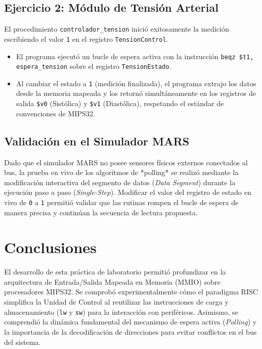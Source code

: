 \documentclass[12pt, letterpaper]{article}
\begin{document}
\subsection{Ejercicio 2: Módulo de Tensión Arterial}
El procedimiento \texttt{controlador\_tension} inició exitosamente la medición escribiendo el valor \texttt{1} en el registro \texttt{TensionControl}.
\begin{itemize}
    \item El programa ejecutó un bucle de espera activa con la instrucción \texttt{beqz \$t1, espera\_tension} sobre el registro \texttt{TensionEstado}.
    \item Al cambiar el estado a \texttt{1} (medición finalizada), el programa extrajo los datos desde la memoria mapeada y los retornó simultáneamente en los registros de salida \texttt{\$v0} (Sistólica) y \texttt{\$v1} (Diastólica), respetando el estándar de convenciones de MIPS32.
\end{itemize}

\subsection{Validación en el Simulador MARS}
Dado que el simulador MARS no posee sensores físicos externos conectados al bus, la prueba en vivo de los algoritmos de *polling* se realizó mediante la modificación interactiva del segmento de datos (\textit{Data Segment}) durante la ejecución paso a paso (\textit{Single-Step}). Modificar el valor del registro de estado en vivo de \texttt{0} a \texttt{1} permitió validar que las rutinas rompen el bucle de espera de manera precisa y continúan la secuencia de lectura propuesta.

\newpage

\section{Conclusiones}

El desarrollo de esta práctica de laboratorio permitió profundizar en la arquitectura de Entrada/Salida Mapeada en Memoria (MMIO) sobre procesadores MIPS32. Se comprobó experimentalmente cómo el paradigma RISC simplifica la Unidad de Control al reutilizar las instrucciones de carga y almacenamiento (\texttt{lw} y \texttt{sw}) para la interacción con periféricos. Asimismo, se comprendió la dinámica fundamental del mecanismo de espera activa (\textit{Polling}) y la importancia de la decodificación de direcciones para evitar conflictos en el bus del sistema.
\end{document}
